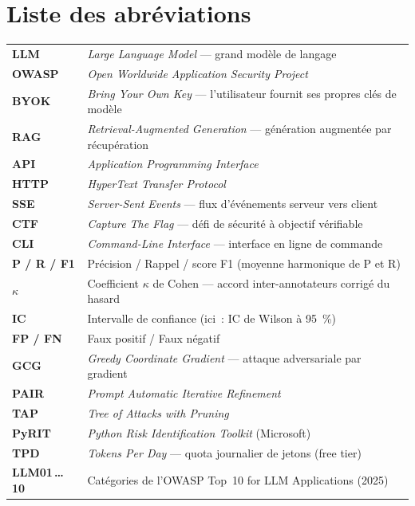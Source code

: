 \chapter*{Liste des abréviations}
\thispagestyle{plain}

\begin{longtable}{p{3cm} p{11.5cm}}
\textbf{LLM} & \emph{Large Language Model} — grand modèle de langage \\[2pt]
\textbf{OWASP} & \emph{Open Worldwide Application Security Project} \\[2pt]
\textbf{BYOK} & \emph{Bring Your Own Key} — l'utilisateur fournit ses propres clés de modèle \\[2pt]
\textbf{RAG} & \emph{Retrieval-Augmented Generation} — génération augmentée par récupération \\[2pt]
\textbf{API} & \emph{Application Programming Interface} \\[2pt]
\textbf{HTTP} & \emph{HyperText Transfer Protocol} \\[2pt]
\textbf{SSE} & \emph{Server-Sent Events} — flux d'événements serveur vers client \\[2pt]
\textbf{CTF} & \emph{Capture The Flag} — défi de sécurité à objectif vérifiable \\[2pt]
\textbf{CLI} & \emph{Command-Line Interface} — interface en ligne de commande \\[2pt]
\textbf{P / R / F1} & Précision / Rappel / score F1 (moyenne harmonique de P et R) \\[2pt]
\textbf{$\kappa$} & Coefficient $\kappa$ de Cohen — accord inter-annotateurs corrigé du hasard \\[2pt]
\textbf{IC} & Intervalle de confiance (ici~: IC de Wilson à 95~\%) \\[2pt]
\textbf{FP / FN} & Faux positif / Faux négatif \\[2pt]
\textbf{GCG} & \emph{Greedy Coordinate Gradient} — attaque adversariale par gradient \\[2pt]
\textbf{PAIR} & \emph{Prompt Automatic Iterative Refinement} \\[2pt]
\textbf{TAP} & \emph{Tree of Attacks with Pruning} \\[2pt]
\textbf{PyRIT} & \emph{Python Risk Identification Toolkit} (Microsoft) \\[2pt]
\textbf{TPD} & \emph{Tokens Per Day} — quota journalier de jetons (free tier) \\[2pt]
\textbf{LLM01\,\ldots\,10} & Catégories de l'OWASP Top~10 for LLM Applications (2025) \\[2pt]
\end{longtable}
